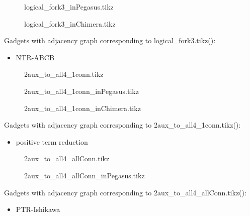 \documentclass{article}
\begin{document}
\begin{figure}

\caption{logical\_fork3\_inPegasus.tikz}
\end{figure}

\begin{figure}

\caption{logical\_fork3\_inChimera.tikz}
\end{figure}

Gadgets with adjacency graph corresponding to logical\_fork3.tikz(\scalebox{.25}{}):

\begin{itemize}
\item NTR-ABCB
\end{itemize}

\begin{figure}

\caption{2aux\_to\_all4\_1conn.tikz}
\end{figure}

\begin{figure}

\caption{2aux\_to\_all4\_1conn\_inPegasus.tikz}
\end{figure}

\begin{figure}

\caption{2aux\_to\_all4\_1conn\_inChimera.tikz}
\end{figure}

Gadgets with adjacency graph corresponding to 2aux\_to\_all4\_1conn.tikz(\scalebox{.25}{}):

\begin{itemize}
\item positive term reduction
\end{itemize}

\begin{figure}

\caption{2aux\_to\_all4\_allConn.tikz}
\end{figure}

\begin{figure}

\caption{2aux\_to\_all4\_allConn\_inPegasus.tikz}
\end{figure}



Gadgets with adjacency graph corresponding to 2aux\_to\_all4\_allConn.tikz(\scalebox{.25}{}):

\begin{itemize}
\item PTR-Ishikawa
\end{itemize}
\end{document}

